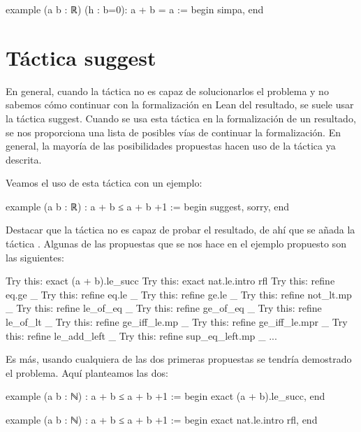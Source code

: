 \begin{leancode}
example (a b : ℝ) (h : b=0): a + b = a :=
begin
  simpa,
end
\end{leancode}

\section{Táctica suggest}

En general, cuando la táctica  no es
capaz de solucionarlos el problema y no sabemos cómo continuar con la
formalización en Lean del resultado, se suele usar la táctica 
{suggest}. Cuando se usa esta táctica en la formalización de un resultado, se
nos proporciona una lista de posibles vías de continuar la formalización. En
general, la mayoría de las posibilidades propuestas hacen uso de la táctica
 ya descrita.

Veamos el uso de esta táctica con un ejemplo:

\begin{leancode}
example (a b : ℝ) : a + b ≤ a + b +1 :=
begin
  suggest,
  sorry,
end
\end{leancode}

Destacar que la táctica  no es capaz de probar el
resultado, de ahí que se añada la táctica . Algunas de
las propuestas que se nos hace en el ejemplo propuesto son las siguientes:

\begin{leancode}
Try this: exact (a + b).le_succ
Try this: exact nat.le.intro rfl
Try this: refine eq.ge _
Try this: refine eq.le _
Try this: refine ge.le _
Try this: refine not_lt.mp _
Try this: refine le_of_eq _
Try this: refine ge_of_eq _
Try this: refine le_of_lt _
Try this: refine ge_iff_le.mp _
Try this: refine ge_iff_le.mpr _
Try this: refine le_add_left _
Try this: refine sup_eq_left.mp _
...
\end{leancode}

Es más, usando cualquiera de las dos primeras propuestas se tendría demostrado
el problema. Aquí planteamos las dos:

\begin{leancode}
example (a b : ℕ) : a + b ≤ a + b +1 :=
begin
  exact (a + b).le_succ,
end

example (a b : ℕ) : a + b ≤ a + b +1 :=
begin
  exact nat.le.intro rfl,
end
\end{leancode}


